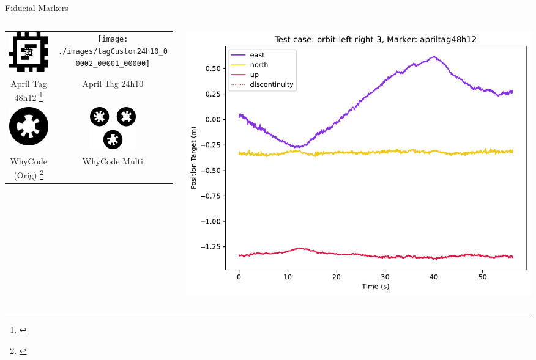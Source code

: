 \documentclass[aspectratio=169]{beamer}
\begin{document}
\begin{frame}{Fiducial Markers}
\begin{columns}
\begin{column}{0.4\textwidth}
	\centering
	\begin{tabular}{cc}
		\includegraphics[width=2cm]{./images/tagCustom48h12_00002_00001_00000}
		&
		\texttt{[image: ./images/tagCustom24h10\_00002\_00001\_00000]}
		\\
		April Tag 48h12%
		\footnote[frame]{\cite{apriltag3_paper}}
		&
		April Tag 24h10%
		\\
		\includegraphics[width=2cm]{./images/whycode_20_8}
		&
		\includegraphics[width=2cm]{./images/whycode_multi}
		\\
		WhyCode (Orig)%
		\footnote[frame]{\cite{whycode_paper}}
		&
		WhyCode Multi%
	\end{tabular}
\end{column}
\begin{column}{0.6\textwidth}
	\centering
	\includegraphics[width=\linewidth]{images/orbit-left-right-3_apriltag48h12_position-target}
\end{column}
\end{columns}
\end{frame}
\end{document}
